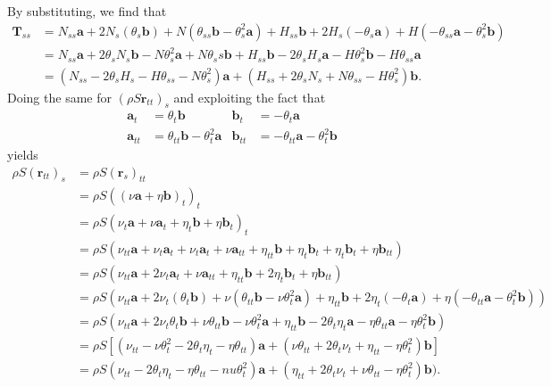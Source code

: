 \documentclass{article}
\begin{document}
By substituting, we find that
\begin{equation}
\begin{split}
\mathbf{T}_{ss}& = N_{ss}\mathbf{a} + 2N_s(\theta_s\mathbf{b}) + N(\theta_{ss}\mathbf{b}-\theta_s^2\mathbf{a}) + H_{ss}\mathbf{b} + 2H_s(-\theta_s\mathbf{a}) + H(-\theta_{ss}\mathbf{a}-\theta_s^2\mathbf{b})\\
               & = N_{ss}\mathbf{a} + 2\theta_sN_s\mathbf{b}- N\theta_s^2\mathbf{a} + N\theta_ss\mathbf{b} + H_{ss}\mathbf{b} -2\theta_sH_s\mathbf{a}-H\theta_s^2\mathbf{b}-H\theta_{ss}\mathbf{a}\\
               & = (N_{ss} -2\theta_sH_s - H\theta_{ss}-N\theta_s^2)\mathbf{a} + (H_{ss}+2\theta_sN_s + N\theta_{ss} -H\theta_s^2)\mathbf{b}.
\end{split}
\end{equation}
Doing the same for $(\rho S\mathbf{r}_{tt})_s$ and exploiting the fact that 
\begin{align}
\mathbf{a}_t    &=\theta_t\mathbf{b} & \mathbf{b}_t &= -\theta_t\mathbf{a}\\
\mathbf{a}_{tt} &=\theta_{tt}\mathbf{b}-\theta_t^2\mathbf{a} & \mathbf{b}_{tt} &= -\theta_{tt}\mathbf{a}-\theta_t^2\mathbf{b} 
\end{align}
yields
\begin{equation}
\begin{split}
\rho S(\mathbf{r}_{tt})_s &= \rho S (\mathbf{r}_s)_{tt}\\
                          &= \rho S ((\nu\mathbf{a} + \eta\mathbf{b})_t)_t\\
                          &= \rho S (\nu_t\mathbf{a} + \nu\mathbf{a}_t + \eta_t\mathbf{b} + \eta\mathbf{b}_t)_t\\
                          &= \rho S (\nu_{tt}\mathbf{a} + \nu_t\mathbf{a}_t + \nu_t\mathbf{a}_t + \nu\mathbf{a}_{tt} + \eta_{tt}\mathbf{b} + \eta_t\mathbf{b}_t + \eta_t\mathbf{b}_t + \eta\mathbf{b}_{tt})\\
                          &= \rho S (\nu_{tt}\mathbf{a} + 2\nu_t\mathbf{a}_t + \nu\mathbf{a}_{tt} + \eta_{tt}\mathbf{b} + 2\eta_t\mathbf{b}_t + \eta\mathbf{b}_{tt})\\
                          &= \rho S (\nu_{tt}\mathbf{a} + 2\nu_t(\theta_t\mathbf{b}) + \nu(\theta_{tt}\mathbf{b}-\nu\theta_t^2\mathbf{a}) + \eta_{tt}\mathbf{b} + 2\eta_t(-\theta_t\mathbf{a}) + \eta(-\theta_{tt}\mathbf{a}-\theta_t^2\mathbf{b}))\\
                          &= \rho S (\nu_{tt}\mathbf{a} + 2\nu_t\theta_t\mathbf{b} + \nu\theta_{tt}\mathbf{b}-\nu\theta_t^2\mathbf{a} + \eta_{tt}\mathbf{b} - 2\theta_t\eta_t\mathbf{a} - \eta\theta_{tt}\mathbf{a} - \eta\theta_t^2\mathbf{b})\\
                          &= \rho S \left[ (\nu_{tt}-\nu\theta_t^2 - 2\theta_t\eta_t -\eta\theta_{tt})\mathbf{a} + (\nu\theta_{tt} + 2\theta_t\nu_t + \eta_{tt} - \eta\theta_t^2)\mathbf{b} \right]\\
                          &= \rho S (\nu_{tt} - 2\theta_t\eta_t -\eta\theta_{tt} - nu\theta_t^2  )\mathbf{a}+ (\eta_{tt}+ 2\theta_t\nu_t + \nu\theta_{tt} - \eta\theta_t^2)\mathbf{b}).
\end{split}
\end{equation}
\end{document}

